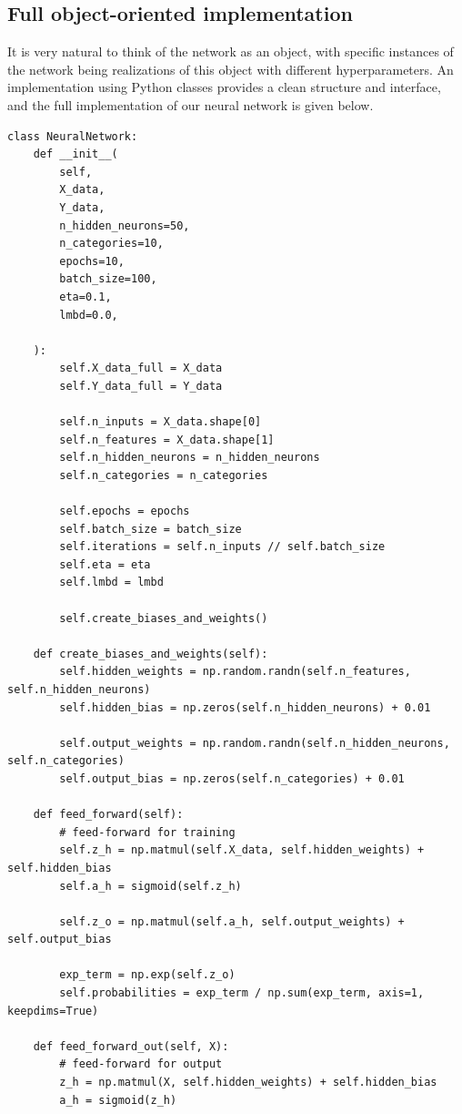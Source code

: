 \documentclass[%
oneside,                 %
final,                   %
10pt]{article}
\begin{document}
\subsection*{Full object-oriented implementation}

It is very natural to think of the network as an object, with specific instances of the network
being realizations of this object with different hyperparameters. An implementation using Python classes provides a clean structure and interface, and the full implementation of our neural network is given below.


\begin{verbatim}
class NeuralNetwork:
    def __init__(
        self,
        X_data,
        Y_data,
        n_hidden_neurons=50,
        n_categories=10,
        epochs=10,
        batch_size=100,
        eta=0.1,
        lmbd=0.0,

    ):
        self.X_data_full = X_data
        self.Y_data_full = Y_data

        self.n_inputs = X_data.shape[0]
        self.n_features = X_data.shape[1]
        self.n_hidden_neurons = n_hidden_neurons
        self.n_categories = n_categories

        self.epochs = epochs
        self.batch_size = batch_size
        self.iterations = self.n_inputs // self.batch_size
        self.eta = eta
        self.lmbd = lmbd

        self.create_biases_and_weights()

    def create_biases_and_weights(self):
        self.hidden_weights = np.random.randn(self.n_features, self.n_hidden_neurons)
        self.hidden_bias = np.zeros(self.n_hidden_neurons) + 0.01

        self.output_weights = np.random.randn(self.n_hidden_neurons, self.n_categories)
        self.output_bias = np.zeros(self.n_categories) + 0.01

    def feed_forward(self):
        # feed-forward for training
        self.z_h = np.matmul(self.X_data, self.hidden_weights) + self.hidden_bias
        self.a_h = sigmoid(self.z_h)

        self.z_o = np.matmul(self.a_h, self.output_weights) + self.output_bias

        exp_term = np.exp(self.z_o)
        self.probabilities = exp_term / np.sum(exp_term, axis=1, keepdims=True)

    def feed_forward_out(self, X):
        # feed-forward for output
        z_h = np.matmul(X, self.hidden_weights) + self.hidden_bias
        a_h = sigmoid(z_h)


\end{verbatim}
\end{document}
